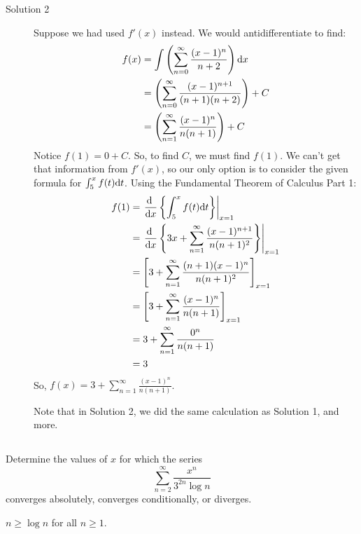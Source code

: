 \begin{solution}
\begin{description}
		\item[Solution 2]
		Suppose we had used $f'(x)$ instead. We would antidifferentiate to find:
		\begin{align*}
		f(x)&=\int \left( \sum_{n=0}^\infty \frac{(x-1)^{n}}{n+2}  \right)\mathrm{d}x\\
		&=\left(\sum_{n=0}^\infty \frac{(x-1)^{n+1}}{(n+1)(n+2)}\right)+C\\
		&=\left(\sum_{n=1}^\infty \frac{(x-1)^{n}}{n(n+1)}\right)+C
		\end{align*}
		Notice $f(1)=0+C$. So, to find $C$, we must find $f(1)$. We can't get that information from $f'(x)$, so our only option is to consider the given formula for $\int_5^x f(t)\mathrm{d}t$. Using the Fundamental Theorem of Calculus Part 1:
		\begin{align*}
		f(1)&=\left.\diff{}{x}\left\{\int_5^x f(t)\dee{t} \right\}\right|_{x=1}\\
		&=\left.\diff{}{x}\left\{ 3x+\displaystyle\sum_{n=1}^\infty \frac{(x-1)^{n+1}}{n(n+1)^2}  \right\}\right|_{x=1}\\
		&=\left[ 3+\displaystyle\sum_{n=1}^\infty \frac{(n+1)(x-1)^{n}}{n(n+1)^2}  \right]_{x=1}\\
		&=\left[ 3+\displaystyle\sum_{n=1}^\infty \frac{(x-1)^{n}}{n(n+1)}  \right]_{x=1}\\
		&= 3+\displaystyle\sum_{n=1}^\infty \frac{0^{n}}{n(n+1)}\\
		&=3
		\end{align*}
		So, $f(x)=3+\displaystyle\sum_{n=1}^\infty \frac{(x-1)^{n}}{n(n+1)}$.

		Note that in Solution 2, we did the same calculation as Solution 1, and more.
	\end{description}
\end{solution}


\subsection*{\Application}

\begin{Mquestion}[M121 2002A]
Determine the values of $x$ for which the series
\begin{equation*}
\sum_{n=2}^\infty\frac{x^n}{3^{2n}\log n}
\end{equation*}
converges absolutely, converges conditionally, or diverges.
\end{Mquestion}

\begin{hint}
$n\ge\log n$ for all $n\ge 1$.
\end{hint}


